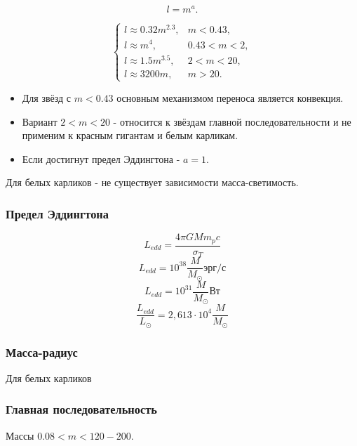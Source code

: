 \begin{equation}
	l = m^a.
\end{equation}

\begin{equation}
\begin{cases}
	l \approx 0.32m^{2.3}, & m<0.43, \\
	l \approx m^{4}, & 0.43<m<2, \\
	l \approx 1.5m^{3.5}, & 2<m<20, \\
	l \approx 3200m, & m>20.
\end{cases}
\end{equation}
\begin{itemize}
\item Для звёзд с $m<0.43$ основным механизмом переноса является конвекция. 
\item Вариант $2<m<20$ - относится к звёздам главной последовательности и не применим к красным гигантам и белым карликам.
\item Если достигнут предел Эддингтона - $a=1$.
\end{itemize}

Для белых карликов - не существует зависимости масса-светимость.


\subsubsection{Предел Эддингтона}

\begin{equation}L_{edd} = \frac{4\pi GM m_p c}{\sigma_T}\end{equation}
\begin{equation}L_{edd} = 10^{38}\frac{M}{M_\odot}\mbox{эрг/с}\end{equation}
\begin{equation*}L_{edd} = 10^{31}\frac{M}{M_\odot}\mbox{Вт}\end{equation*}
\begin{equation}\frac{L_{edd}}{L_\odot} = 2,613\cdot 10^{4}\frac{M}{M_\odot}\end{equation}

\subsubsection{Масса-радиус}

Для белых карликов



\subsubsection{Главная последовательность}
Массы $0.08<m<120-200$.

